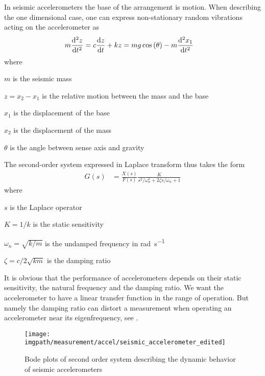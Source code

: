In seismic accelerometers the base of the arrangement is motion. When describing the one dimensional case, one can express non-stationary random vibrations acting on the accelerometer as
\begin{align}
    m\dv[2]{z}{t} &= c\dv{z}{t} + kz = mg\cos\pqty{\theta}-m\dv[2]{x_1}{t}
\end{align}
where
\begin{description}[topsep=0ex, noitemsep]
    \item $m$ is the seismic mass
    \item $z=x_2-x_1$ is the relative motion between the mass and the base
    \item $x_1$ is the displacement of the base
    \item $x_2$ is the displacement of the mass
    \item $\theta$ is the angle between sense axis and gravity
\end{description}
The second-order system expressed in Laplace transform thus takes the form
\begin{align}
    G(s) &= \frac{X(s)}{F(s)} \frac{K}{s^2/\omega_n^2 + 2\zeta s/\omega_n + 1}
\end{align}
where
\begin{description}[topsep=0ex, noitemsep]
    \item $s$ is the Laplace operator
    \item $K=1/k$ is the static sensitivity
    \item $\omega_n=\sqrt{k/m}$ is the undamped frequency in \si{\radian\per\second}
    \item $\zeta=c/2\sqrt{km}$ is the damping ratio
\end{description}
It is obvious that the performance of accelerometers depends on their static sensitivity, the natural frequency and the damping ratio. We want the accelerometer to have a linear transfer function in the range of operation. But namely the damping ratio can distort a measurement when operating an accelerometer near its eigenfrequency, see .


\begin{figure}[!htb]
    \centering
    \texttt{[image: \\imgpath/measurement/accel/seismic\_accelerometer\_edited]}
    \caption[Second-Order System Bode plots]{Bode plots of second order system describing the dynamic behavior of seismic accelerometers}
    \label{fig:seismic_accelerometer_edited}
\end{figure}

